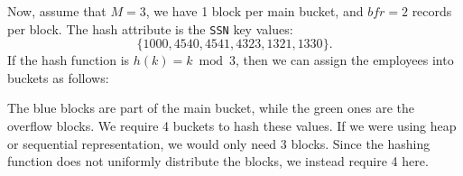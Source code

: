 \documentclass[a4paper, openany]{memoir}
\begin{document}
Now, assume that $M = 3$, we have 1 block per main bucket, and $\textit{bfr} = 2$ records per block. The hash attribute is the \texttt{SSN} key values:
\[\{1000, 4540, 4541, 4323, 1321, 1330\}.\]
If the hash function is $h(k) = k \bmod{3}$, then we can assign the employees into buckets as follows:
\begin{figure}[H]
    \centering
\end{figure}
\noindent The blue blocks are part of the main bucket, while the green ones are the overflow blocks. We require 4 buckets to hash these values. If we were using heap or sequential representation, we would only need 3 blocks. Since the hashing function does not uniformly distribute the blocks, we instead require 4 here.



\end{document}
